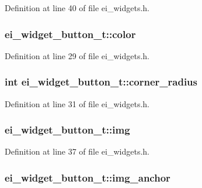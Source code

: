 Definition at line 40 of file ei\-\_\-widgets.\-h.

\hypertarget{structei__widget__button__t_a9fb4cdb0541591221c5dcfc88dc869b9}{
\subsubsection[{color}]{ ei\-\_\-widget\-\_\-button\-\_\-t\-::color}}\label{structei__widget__button__t_a9fb4cdb0541591221c5dcfc88dc869b9}


Definition at line 29 of file ei\-\_\-widgets.\-h.

\hypertarget{structei__widget__button__t_a34822359cc6bd4a196b9ccc545441748}{
\subsubsection[{corner\-\_\-radius}]{\setlength{\rightskip}{0pt plus 5cm}int ei\-\_\-widget\-\_\-button\-\_\-t\-::corner\-\_\-radius}}\label{structei__widget__button__t_a34822359cc6bd4a196b9ccc545441748}


Definition at line 31 of file ei\-\_\-widgets.\-h.

\hypertarget{structei__widget__button__t_a6bae8ac3b27a453f7a56299a2ed58ac7}{
\subsubsection[{img}]{ ei\-\_\-widget\-\_\-button\-\_\-t\-::img}}\label{structei__widget__button__t_a6bae8ac3b27a453f7a56299a2ed58ac7}


Definition at line 37 of file ei\-\_\-widgets.\-h.

\hypertarget{structei__widget__button__t_a24dc795533f63d7759d2572b3899ca7c}{
\subsubsection[{img\-\_\-anchor}]{ ei\-\_\-widget\-\_\-button\-\_\-t\-::img\-\_\-anchor}}\label{structei__widget__button__t_a24dc795533f63d7759d2572b3899ca7c}


